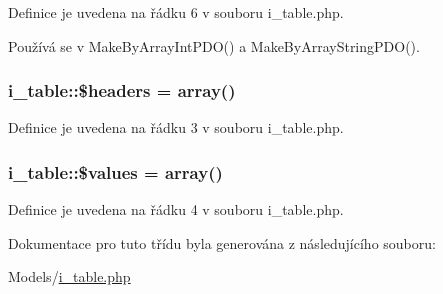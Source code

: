 Definice je uvedena na řádku 6 v souboru i\-\_\-table.\-php.



Používá se v Make\-By\-Array\-Int\-P\-D\-O() a Make\-By\-Array\-String\-P\-D\-O().

\hypertarget{classi__table_aafeab09cd2305339aa9cc61c0da380da}{
\subsubsection[{\$headers}]{\setlength{\rightskip}{0pt plus 5cm}i\-\_\-table\-::\$headers = array()\hspace{0.3cm}{\ttfamily [private]}}}\label{classi__table_aafeab09cd2305339aa9cc61c0da380da}


Definice je uvedena na řádku 3 v souboru i\-\_\-table.\-php.

\hypertarget{classi__table_a4a9cba4b5863bea1cb70f6d0d0f76956}{
\subsubsection[{\$values}]{\setlength{\rightskip}{0pt plus 5cm}i\-\_\-table\-::\$values = array()\hspace{0.3cm}{\ttfamily [private]}}}\label{classi__table_a4a9cba4b5863bea1cb70f6d0d0f76956}


Definice je uvedena na řádku 4 v souboru i\-\_\-table.\-php.



Dokumentace pro tuto třídu byla generována z následujícího souboru\-:\begin{DoxyCompactItemize}
\item 
Models/\hyperlink{i__table_8php}{i\-\_\-table.\-php}\end{DoxyCompactItemize}
